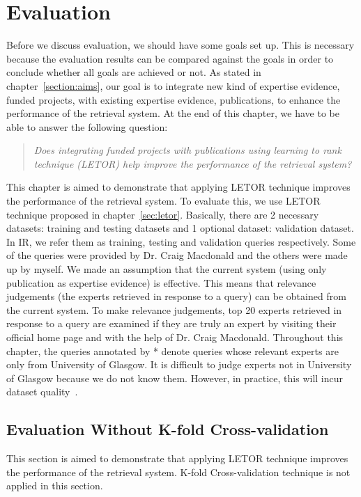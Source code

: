 
\chapter{Evaluation}\label{sec:evaluation}

Before we discuss evaluation, we should have some goals set up. This is necessary because the evaluation results can be compared against the goals in order to
conclude whether all goals are achieved or not. As stated in chapter~\ref{section:aims}, our goal is to integrate new kind of expertise evidence, funded projects,
with existing expertise evidence, publications, to enhance the performance of the retrieval system. At the end of this chapter, we have to be able to 
answer the following question:

\begin{quotation}
 \textit{Does integrating funded projects with publications using learning to rank technique (LETOR) help improve the performance of the retrieval system?}
\end{quotation}

This chapter is aimed to demonstrate that applying LETOR technique improves the performance of the retrieval system. To evaluate this, we use LETOR
technique proposed in chapter~\ref{sec:letor}. Basically, there are 2 necessary datasets: training and testing datasets and 1 optional dataset:
validation dataset. In IR, 
we refer them as training, testing and validation queries respectively. 
Some of the queries were provided by Dr. Craig Macdonald and the others were made up by myself. 
We made an assumption that the current system (using only publication as expertise evidence) is effective. This means that relevance judgements 
(the experts retrieved in response to a query) can be obtained from the current system. To make relevance judgements, top 20 experts retrieved in response to a query
are examined if they are truly an expert by visiting their official home page and with the help of Dr. Craig Macdonald.
Throughout this chapter, the queries annotated by * denote queries whose relevant experts are only from University of Glasgow. 
It is difficult to judge experts not in University of Glasgow because we 
do not know them. However, in practice, this will incur dataset quality~\cite{craig}.


\section{Evaluation Without K-fold Cross-validation}
This section is aimed to demonstrate that applying LETOR technique improves the performance of the retrieval system. K-fold Cross-validation technique
is not applied in this section.

